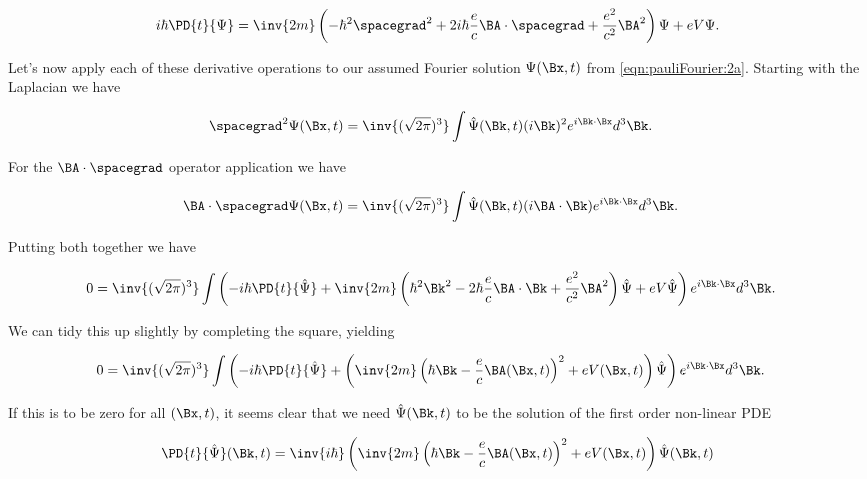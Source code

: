 \begin{align}\label{eqn:pauliFourier:3}
i \hbar \PD{t}{\Psi} = \inv{2m} \left( - \hbar^2 \spacegrad^2 + 2 i \hbar \frac{e}{c} \BA \cdot \spacegrad + \frac{e^2}{c^2} \BA^2 \right) \Psi + e V \Psi.
\end{align}

Let's now apply each of these derivative operations to our assumed Fourier solution $\Psi(\Bx, t)$ from \ref{eqn:pauliFourier:2a}.  Starting with the Laplacian we have

\begin{align}\label{eqn:pauliFourier:xx1}
\spacegrad^2 \Psi(\Bx, t) &=
\inv{(\sqrt{2 \pi})^3} \int \hat{\Psi}(\Bk, t) (i\Bk)^2 e^{i \Bk \cdot \Bx} d^3 \Bk.
\end{align}

For the $\BA \cdot \spacegrad$ operator application we have

\begin{align}\label{eqn:pauliFourier:xx2}
\BA \cdot \spacegrad \Psi(\Bx, t) &=
\inv{(\sqrt{2 \pi})^3} \int \hat{\Psi}(\Bk, t) (i \BA \cdot \Bk) e^{i \Bk \cdot \Bx} d^3 \Bk.
\end{align}

Putting both together we have

\begin{align}\label{eqn:pauliFourier:5}
0 &= 
\inv{(\sqrt{2 \pi})^3} \int 
\left(
-i \hbar \PD{t}{\hat{\Psi}} + \inv{2m} \left( \hbar^2 \Bk^2 - 2 \hbar \frac{e}{c} \BA \cdot \Bk + \frac{e^2}{c^2} \BA^2 \right) \hat{\Psi} + e V \hat{\Psi} \right)
e^{i \Bk \cdot \Bx} d^3 \Bk.
\end{align}

We can tidy this up slightly by completing the square, yielding

\begin{align}\label{eqn:pauliFourier:5b}
0 &= 
\inv{(\sqrt{2 \pi})^3} \int 
\left(
-i \hbar \PD{t}{\hat{\Psi}} + \left( \inv{2m} \left( \hbar \Bk - \frac{e}{c} \BA(\Bx, t) \right)^2 + e V(\Bx, t) \right) \hat{\Psi} \right)
e^{i \Bk \cdot \Bx} d^3 \Bk.
\end{align}

If this is to be zero for all $(\Bx, t)$, it seems clear that we need $\hat{\Psi}(\Bk, t)$ to be the solution of the first order non-linear PDE

\begin{align}\label{eqn:pauliFourier:6}
\PD{t}{\hat{\Psi}}(\Bk, t) = \inv{i \hbar} \left( \inv{2m} \left( \hbar \Bk - \frac{e}{c} \BA(\Bx, t) \right)^2 + e V(\Bx, t) \right) \hat{\Psi}(\Bk, t)
\end{align}

